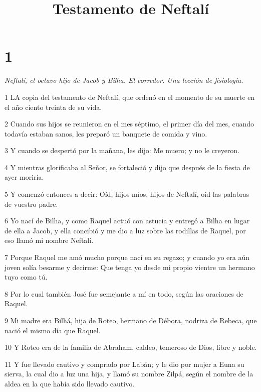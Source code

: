 

\title{Testamento de Neftalí}

\chapter{1}

\par \textit{Neftalí, el octavo hijo de Jacob y Bilha. El corredor. Una lección de fisiología.}

\par 1 LA copia del testamento de Neftalí, que ordenó en el momento de su muerte en el año ciento treinta de su vida.

\par 2 Cuando sus hijos se reunieron en el mes séptimo, el primer día del mes, cuando todavía estaban sanos, les preparó un banquete de comida y vino.

\par 3 Y cuando se despertó por la mañana, les dijo: Me muero; y no le creyeron.

\par 4 Y mientras glorificaba al Señor, se fortaleció y dijo que después de la fiesta de ayer moriría.

\par 5 Y comenzó entonces a decir: Oíd, hijos míos, hijos de Neftalí, oíd las palabras de vuestro padre.

\par 6 Yo nací de Bilha, y como Raquel actuó con astucia y entregó a Bilha en lugar de ella a Jacob, y ella concibió y me dio a luz sobre las rodillas de Raquel, por eso llamó mi nombre Neftalí.

\par 7 Porque Raquel me amó mucho porque nací en su regazo; y cuando yo era aún joven solía besarme y decirme: Que tenga yo desde mi propio vientre un hermano tuyo como tú.

\par 8 Por lo cual también José fue semejante a mí en todo, según las oraciones de Raquel.

\par 9 Mi madre era Bilhá, hija de Roteo, hermano de Débora, nodriza de Rebeca, que nació el mismo día que Raquel.

\par 10 Y Roteo era de la familia de Abraham, caldeo, temeroso de Dios, libre y noble.

\par 11 Y fue llevado cautivo y comprado por Labán; y le dio por mujer a Euna su sierva, la cual dio a luz una hija, y llamó su nombre Zilpá, según el nombre de la aldea en la que había sido llevado cautivo.

